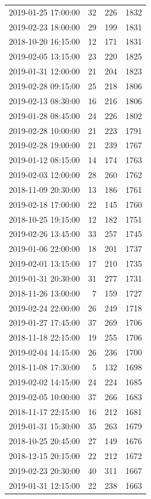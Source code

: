 \begin{tabular}{lrrr}
2019-01-25 17:00:00 & 32 & 226 & 1832 \\
2019-02-23 18:00:00 & 29 & 199 & 1831 \\
2018-10-20 16:15:00 & 12 & 171 & 1831 \\
2019-02-05 13:15:00 & 23 & 220 & 1825 \\
2019-01-31 12:00:00 & 21 & 204 & 1823 \\
2019-02-28 09:15:00 & 25 & 218 & 1806 \\
2019-02-13 08:30:00 & 16 & 216 & 1806 \\
2019-01-28 08:45:00 & 24 & 226 & 1802 \\
2019-02-28 10:00:00 & 21 & 223 & 1791 \\
2019-02-28 19:00:00 & 21 & 239 & 1767 \\
2019-01-12 08:15:00 & 14 & 174 & 1763 \\
2019-02-03 12:00:00 & 28 & 260 & 1762 \\
2018-11-09 20:30:00 & 13 & 186 & 1761 \\
2019-02-18 17:00:00 & 22 & 145 & 1760 \\
2018-10-25 19:15:00 & 12 & 182 & 1751 \\
2019-02-26 13:45:00 & 33 & 257 & 1745 \\
2019-01-06 22:00:00 & 18 & 201 & 1737 \\
2019-02-01 13:15:00 & 17 & 210 & 1735 \\
2019-01-31 20:30:00 & 31 & 277 & 1731 \\
2018-11-26 13:00:00 & 7 & 159 & 1727 \\
2019-02-24 22:00:00 & 26 & 249 & 1718 \\
2019-01-27 17:45:00 & 37 & 269 & 1706 \\
2018-11-18 22:15:00 & 19 & 255 & 1706 \\
2019-02-04 14:15:00 & 26 & 236 & 1700 \\
2018-11-08 17:30:00 & 5 & 132 & 1698 \\
2019-02-02 14:15:00 & 24 & 224 & 1685 \\
2019-02-05 10:00:00 & 37 & 266 & 1683 \\
2018-11-17 22:15:00 & 16 & 212 & 1681 \\
2019-01-31 15:30:00 & 35 & 263 & 1679 \\
2018-10-25 20:45:00 & 27 & 149 & 1676 \\
2018-12-15 20:15:00 & 22 & 212 & 1672 \\
2019-02-23 20:30:00 & 40 & 311 & 1667 \\
2019-01-31 12:15:00 & 22 & 238 & 1663 \\

\end{tabular}
